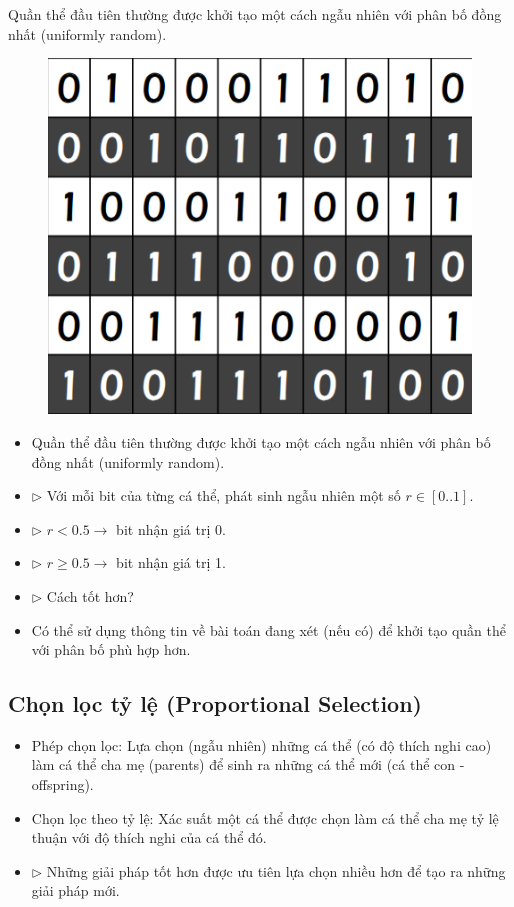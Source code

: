 \documentclass{book}
\begin{document}
Quần thể đầu tiên thường được khởi tạo một cách ngẫu
nhiên với phân bố đồng nhất (uniformly random).
\begin{figure}[H]
    \centering
    \includegraphics[width=0.75\linewidth]{images/init.png}
\end{figure}

\begin{itemize}
    \item Quần thể đầu tiên thường được khởi tạo một cách ngẫu nhiên với phân bố đồng nhất (uniformly random).
    \item[] $\triangleright$ Với mỗi bit của từng cá thể, phát sinh ngẫu nhiên một số $r \in [0..1]$.
    \item[] $\triangleright$ $r < 0.5 \rightarrow$ bit nhận giá trị 0.
    \item[] $\triangleright$ $r \ge 0.5 \rightarrow$ bit nhận giá trị 1.
    \item[] $\triangleright$ Cách tốt hơn?
    \item Có thể sử dụng thông tin về bài toán đang xét (nếu có) để khởi tạo quần thể với phân bố phù hợp hơn.
\end{itemize}

\subsection{Chọn lọc tỷ lệ (Proportional Selection)}

\begin{itemize}
    \item Phép chọn lọc: Lựa chọn (ngẫu nhiên) những cá thể (có độ thích nghi cao) làm cá thể cha mẹ (parents) để sinh ra những cá thể mới (cá thể con - offspring).
    \item Chọn lọc theo tỷ lệ: Xác suất một cá thể được chọn làm cá thể cha mẹ tỷ lệ thuận với độ thích nghi của cá thể đó.
    \item[] $\triangleright$ Những giải pháp tốt hơn được ưu tiên lựa chọn nhiều hơn để tạo ra những giải pháp mới.
\end{itemize}
\end{document}
